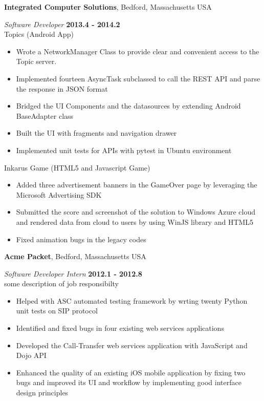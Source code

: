 \documentclass[margin,line]{res}
\begin{document}
\begin{resume}
{\bf Integrated Computer Solutions}, Bedford, Massachusetts USA

\vspace{-.3cm}
{\em Software Developer} \hfill {\bf 2013.4 - 2014.2}\\
Topics (Android App)
\begin{itemize}
\item Wrote a NetworkManager Class to provide clear and convenient access to the Topic server.
\item Implemented fourteen AsyncTask subclassed to call the REST API and parse the response
in JSON format
\item Bridged the UI Components and the datasources by extending Android BaseAdapter class
\item Built the UI with fragments and navigation drawer
\item Implemented unit tests for APIs with pytest in Ubuntu environment
\end{itemize}

Inkarus Game (HTML5 and Javascript Game)
\begin{itemize}
\item Added three advertisement banners in the GameOver page by leveraging 
the Microsoft Advertising SDK
\item Submitted the score and screenshot of the solution to Windows Azure cloud
and rendered data from cloud to users by using WinJS library and HTML5
\item Fixed animation bugs in the legacy codes
\end{itemize}

{\bf Acme Packet}, Bedford, Massachusetts USA

\vspace{-.3cm}
{\em Software Developer Intern} \hfill {\bf 2012.1 - 2012.8}\\
some description of job responsibilty
\begin{itemize}
\item Helped with ASC automated testing framework by wrting twenty Python unit tests on SIP protocol
\item Identified and fixed bugs in four existing web services applications
\item Developed the Call-Transfer web services application with JavaScript and Dojo API
\item Enhanced the quality of an existing iOS mobile application by fixing two bugs and improved its UI and
workflow by implementing good interface design principles 
\end{itemize}


\end{resume}
\end{document}
